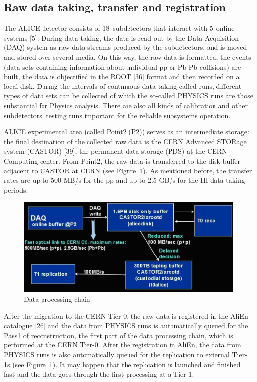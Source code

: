 \documentclass{intech}
\begin{document}
\subsection{Raw data taking, transfer and registration}
%
The ALICE detector consists of 18~subdetectors that interact with
5~online systems [5]. During data taking, the data is read out by
the Data Acquisition (DAQ) system as raw data streams produced by
the subdetectors, and is moved and stored over several media. On
this way, the raw data is formatted, the events (data sets
containing information about individual pp or Pb-Pb collisions) are
built, the data is objectified in the ROOT [36] format and then
recorded on a local disk. During the intervals of continuous data
taking called runs, different types of data sets can be collected of
which the so-called PHYSICS runs are those substantial for Physics
analysis. There are also all kinds of calibration and other
subdetectors' testing runs important for the reliable subsystems
operation.

ALICE experimental area (called Point2 (P2)) serves as an
intermediate storage: the final destination of the collected raw
data is the CERN Advanced STORage system (CASTOR) [39], the permanent
data storage (PDS) at the CERN Computing center. From Point2, the
raw data is transferred to the disk buffer adjacent to CASTOR at
CERN (see Figure~\ref{fig11}). As mentioned before, the transfer
rates are up to 500 MB/s for the pp and up to 2.5 GB/s for the HI
data taking periods.

\begin{figure}[htb] %
\centering
\includegraphics[width=13cm]{fig11.eps} %
\caption{Data processing chain}\label{fig11}
\end{figure}



After the migration to the CERN Tier-0, the raw data is registered
in the AliEn catalogue [26] and the data from PHYSICS runs is
automatically queued for the Pass1 of reconstruction, the first part
of the data processing chain, which is performed at the CERN Tier-0.
After the registration in AliEn, the data from PHYSICS runs is also
automatically queued for the replication to external Tier-1s (see
Figure~\ref{fig11}). It may happen that the replication is launched
and finished fast and the data goes through the first processing at
a Tier-1.
\end{document}

